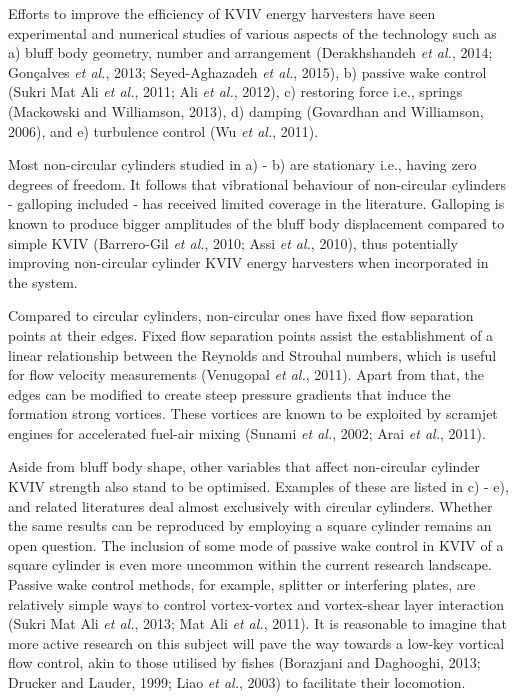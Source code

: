 \documentclass[]{article}
\begin{document}
Efforts to improve the efficiency of KVIV energy harvesters have seen
experimental and numerical studies of various aspects of the technology
such as a) bluff body geometry, number and arrangement (Derakhshandeh
\emph{et al.}, 2014; Gonçalves \emph{et al.}, 2013; Seyed-Aghazadeh
\emph{et al.}, 2015), b) passive wake control (Sukri Mat Ali \emph{et
al.}, 2011; Ali \emph{et al.}, 2012), c) restoring force i.e., springs
(Mackowski and Williamson, 2013), d) damping (Govardhan and Williamson,
2006), and e) turbulence control (Wu \emph{et al.}, 2011).

Most non-circular cylinders studied in a) - b) are stationary i.e.,
having zero degrees of freedom. It follows that vibrational behaviour of
non-circular cylinders - galloping included - has received limited
coverage in the literature. Galloping is known to produce bigger
amplitudes of the bluff body displacement compared to simple KVIV
(Barrero-Gil \emph{et al.}, 2010; Assi \emph{et al.}, 2010), thus
potentially improving non-circular cylinder KVIV energy harvesters when
incorporated in the system.

Compared to circular cylinders, non-circular ones have fixed flow
separation points at their edges. Fixed flow separation points assist
the establishment of a linear relationship between the Reynolds and
Strouhal numbers, which is useful for flow velocity measurements
(Venugopal \emph{et al.}, 2011). Apart from that, the edges can be
modified to create steep pressure gradients that induce the formation
strong vortices. These vortices are known to be exploited by scramjet
engines for accelerated fuel-air mixing (Sunami \emph{et al.}, 2002;
Arai \emph{et al.}, 2011).

Aside from bluff body shape, other variables that affect non-circular
cylinder KVIV strength also stand to be optimised. Examples of these are
listed in c) - e), and related literatures deal almost exclusively with
circular cylinders. Whether the same results can be reproduced by
employing a square cylinder remains an open question. The inclusion of
some mode of passive wake control in KVIV of a square cylinder is even
more uncommon within the current research landscape. Passive wake
control methods, for example, splitter or interfering plates, are
relatively simple ways to control vortex-vortex and vortex-shear layer
interaction (Sukri Mat Ali \emph{et al.}, 2013; Mat Ali \emph{et al.},
2011). It is reasonable to imagine that more active research on this
subject will pave the way towards a low-key vortical flow control, akin
to those utilised by fishes (Borazjani and Daghooghi, 2013; Drucker and
Lauder, 1999; Liao \emph{et al.}, 2003) to facilitate their locomotion.
\end{document}
